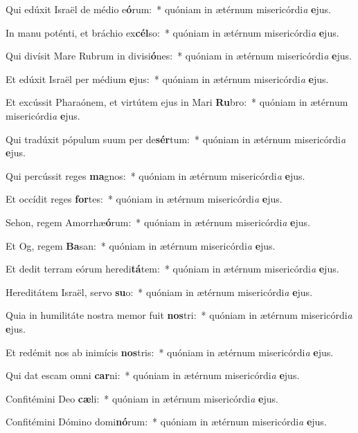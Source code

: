 \item Qui edúxit Israël de médio e\textbf{ó}rum:~* quóniam in ætérnum misericórdi\textit{a} \textbf{e}jus.
\item In manu poténti, et bráchio ex\textbf{cél}so:~* quóniam in ætérnum misericórdi\textit{a} \textbf{e}jus.
\item Qui divísit Mare Rubrum in divisi\textbf{ó}nes:~* quóniam in ætérnum misericórdi\textit{a} \textbf{e}jus.
\item Et edúxit Israël per médium \textbf{e}jus:~* quóniam in ætérnum misericórdi\textit{a} \textbf{e}jus.
\item Et excússit Pharaónem, et virtútem ejus in Mari \textbf{Ru}bro:~* quóniam in ætérnum misericórdi\textit{a} \textbf{e}jus.
\item Qui tradúxit pópulum suum per de\textbf{sér}tum:~* quóniam in ætérnum misericórdi\textit{a} \textbf{e}jus.
\item Qui percússit reges \textbf{ma}gnos:~* quóniam in ætérnum misericórdi\textit{a} \textbf{e}jus.
\item Et occídit reges \textbf{for}tes:~* quóniam in ætérnum misericórdi\textit{a} \textbf{e}jus.
\item Sehon, regem Amorrhæ\textbf{ó}rum:~* quóniam in ætérnum misericórdi\textit{a} \textbf{e}jus.
\item Et Og, regem \textbf{Ba}san:~* quóniam in ætérnum misericórdi\textit{a} \textbf{e}jus.
\item Et dedit terram eórum heredi\textbf{tá}tem:~* quóniam in ætérnum misericórdi\textit{a} \textbf{e}jus.
\item Hereditátem Israël, servo \textbf{su}o:~* quóniam in ætérnum misericórdi\textit{a} \textbf{e}jus.
\item Quia in humilitáte nostra memor fuit \textbf{nos}tri:~* quóniam in ætérnum misericórdi\textit{a} \textbf{e}jus.
\item Et redémit nos ab inimícis \textbf{nos}tris:~* quóniam in ætérnum misericórdi\textit{a} \textbf{e}jus.
\item Qui dat escam omni \textbf{car}ni:~* quóniam in ætérnum misericórdi\textit{a} \textbf{e}jus.
\item Confitémini Deo \textbf{cæ}li:~* quóniam in ætérnum misericórdi\textit{a} \textbf{e}jus.
\item Confitémini Dómino domi\textbf{nó}rum:~* quóniam in ætérnum misericórdi\textit{a} \textbf{e}jus.
